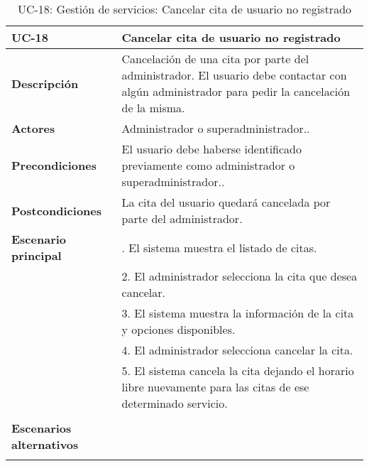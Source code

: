 \begin{table}[H]
  \begin{center}
    \begin{tabularx}{16.4cm}{|l|X|}
      \hline
      \textbf{UC-18} & \textbf{Cancelar cita de usuario no registrado}\\
      \hline
      \textbf{Descripción} & Cancelación de una cita por parte del administrador. El usuario debe contactar con algún administrador para pedir la cancelación de la misma.\\
      \hline
      \textbf{Actores} & Administrador o superadministrador..\\
      \hline
      \textbf{Precondiciones} & El usuario debe haberse identificado previamente como administrador o superadministrador..\\
      \hline
      \textbf{Postcondiciones} & La cita del usuario quedará cancelada por parte del administrador.\\
      \hline
      \textbf{Escenario principal} & \smallskip 1. El sistema muestra el listado de citas.\\
      & 2. El administrador selecciona la cita que desea cancelar.\\
      & 3. El sistema muestra la información de la cita y opciones disponibles.\\
      & 4. El administrador selecciona cancelar la cita.\\
      & 5. El sistema cancela la cita dejando el horario libre nuevamente para las citas de ese determinado servicio.\\
      & \\
      \hline
      \textbf{Escenarios alternativos} & \\
      & \\
      \hline
    \end{tabularx}
    \caption{UC-18: Gestión de servicios: Cancelar cita de usuario no registrado}
  \end{center}
\end{table}


